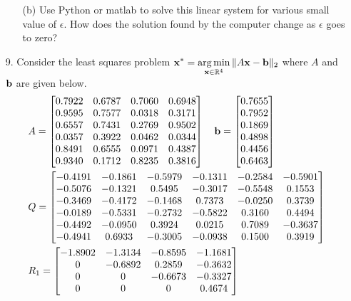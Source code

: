 \documentclass{article}
\newcommand{\bx}{{\bf x}}
\newcommand{\bb}{{\bf b}}
\DeclareMathOperator*{\argmin}{arg\,min}
\begin{document}
\begin{itemize}
\begin{itemize}
                  \item [(b)] Use Python or matlab to solve this linear system for various small value of $\epsilon$. How does the solution found by the computer change as $\epsilon$ goes to zero?
            \end{itemize}
      \item [9.] Consider the least squares problem $\displaystyle \bx^{*} = \argmin_{\bx\in\mathbb{R}^{4}} \|A\bx - \bb\|_{2}$ where $A$ and $\bb$ are given below.
            \begin{align*}
                   & A = \left[\begin{matrix} 0.7922 & 0.6787 & 0.7060 & 0.6948 \\ 0.9595 & 0.7577 & 0.0318 & 0.3171 \\ 0.6557 & 0.7431 & 0.2769 & 0.9502 \\ 0.0357 & 0.3922 & 0.0462 & 0.0344 \\ 0.8491 & 0.6555 & 0.0971 & 0.4387 \\ 0.9340 & 0.1712 & 0.8235 & 0.3816 \end{matrix} \right] \quad \bb = \left[\begin{matrix} 0.7655 \\ 0.7952 \\ 0.1869 \\ 0.4898 \\ 0.4456 \\ 0.6463 \end{matrix}\right] \\
                   & Q = \left[\begin{matrix} -0.4191 & -0.1861 & -0.5979 & -0.1311 & -0.2584 & -0.5901 \\ -0.5076 & -0.1321 & 0.5495 & -0.3017 & -0.5548 & 0.1553 \\ -0.3469 & -0.4172 & -0.1468 & 0.7373 & -0.0250 & 0.3739 \\ -0.0189 & -0.5331 & -0.2732 & -0.5822 & 0.3160 & 0.4494 \\ -0.4492 & -0.0950 & 0.3924 & 0.0215 & 0.7089 & -0.3637 \\ -0.4941 & 0.6933 & -0.3005 & -0.0938 & 0.1500 & 0.3919 \end{matrix}\right]                                                      \\
                   & R_1 = \left[\begin{matrix} -1.8902 & -1.3134 & -0.8595 & -1.1681 \\ 0 & -0.6892 & 0.2859 & -0.3632 \\ 0 & 0 & -0.6673 & -0.3327 \\ 0 & 0 & 0 & 0.4674 \end{matrix}\right]

\end{align*}
\end{itemize}
\end{document}
